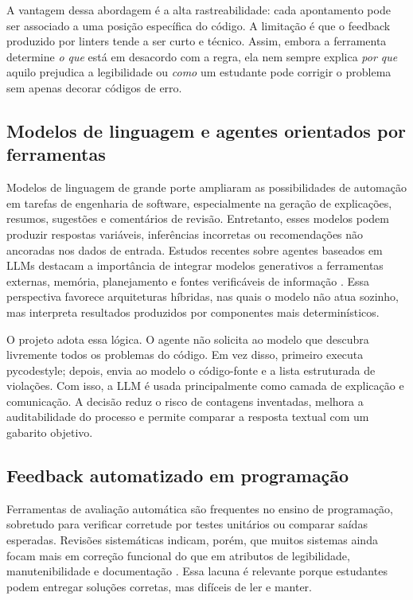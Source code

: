 \documentclass[12pt]{article}
\begin{document}
A vantagem dessa abordagem é a alta rastreabilidade: cada apontamento pode ser
associado a uma posição específica do código. A limitação é que o feedback
produzido por linters tende a ser curto e técnico. Assim, embora a ferramenta
determine \textit{o que} está em desacordo com a regra, ela nem sempre explica
\textit{por que} aquilo prejudica a legibilidade ou \textit{como} um estudante
pode corrigir o problema sem apenas decorar códigos de erro.

\subsection{Modelos de linguagem e agentes orientados por ferramentas}

Modelos de linguagem de grande porte ampliaram as possibilidades de automação
em tarefas de engenharia de software, especialmente na geração de explicações,
resumos, sugestões e comentários de revisão. Entretanto, esses modelos podem
produzir respostas variáveis, inferências incorretas ou recomendações não
ancoradas nos dados de entrada. Estudos recentes sobre agentes baseados em LLMs
destacam a importância de integrar modelos generativos a ferramentas externas,
memória, planejamento e fontes verificáveis de informação
\cite{wang2024agents,plaat2025agentic}. Essa perspectiva favorece arquiteturas
híbridas, nas quais o modelo não atua sozinho, mas interpreta resultados
produzidos por componentes mais determinísticos.

O projeto adota essa lógica. O agente não solicita ao modelo que descubra
livremente todos os problemas do código. Em vez disso, primeiro executa
pycodestyle; depois, envia ao modelo o código-fonte e a lista
estruturada de violações. Com isso, a LLM é usada principalmente como camada de
explicação e comunicação. A decisão reduz o risco de contagens inventadas,
melhora a auditabilidade do processo e permite comparar a resposta textual com
um gabarito objetivo.

\subsection{Feedback automatizado em programação}

Ferramentas de avaliação automática são frequentes no ensino de programação,
sobretudo para verificar corretude por testes unitários ou comparar saídas
esperadas. Revisões sistemáticas indicam, porém, que muitos sistemas ainda
focam mais em correção funcional do que em atributos de legibilidade,
manutenibilidade e documentação \cite{messer2024grading}. Essa lacuna é
relevante porque estudantes podem entregar soluções corretas, mas difíceis de
ler e manter.
\end{document}
